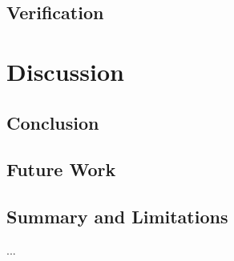 \documentclass{amia}
\begin{document}
\subsection*{Verification}


\section*{Discussion}
\subsection*{Conclusion}
\subsection*{Future Work}
\subsection*{Summary and Limitations}

...


\clearpage


  
\end{document}
